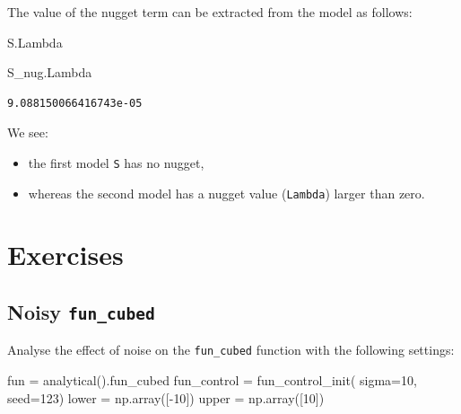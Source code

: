 \documentclass[
  letterpaper,
  DIV=11,
  numbers=noendperiod]{scrreprt}
\newenvironment{Shaded}{\begin{snugshade}}{\end{snugshade}}
\newcommand{\DecValTok}[1]{\textcolor[rgb]{0.68,0.00,0.00}{#1}}
\newcommand{\NormalTok}[1]{\textcolor[rgb]{0.00,0.23,0.31}{#1}}
\newcommand{\OperatorTok}[1]{\textcolor[rgb]{0.37,0.37,0.37}{#1}}
\providecommand{\tightlist}{%
  \setlength{\itemsep}{0pt}\setlength{\parskip}{0pt}}\usepackage{longtable,booktabs,array}
\begin{document}
The value of the nugget term can be extracted from the model as follows:

\begin{Shaded}
\begin{Highlighting}[]
\NormalTok{S.Lambda}
\end{Highlighting}
\end{Shaded}

\begin{Shaded}
\begin{Highlighting}[]
\NormalTok{S\_nug.Lambda}
\end{Highlighting}
\end{Shaded}

\begin{verbatim}
9.088150066416743e-05
\end{verbatim}

We see:

\begin{itemize}
\tightlist
\item
  the first model \texttt{S} has no nugget,
\item
  whereas the second model has a nugget value (\texttt{Lambda}) larger
  than zero.
\end{itemize}

\hypertarget{exercises-6}{%
\section{Exercises}\label{exercises-6}}

\hypertarget{noisy-fun_cubed-1}{%
\subsection{\texorpdfstring{Noisy
\texttt{fun\_cubed}}{Noisy fun\_cubed}}\label{noisy-fun_cubed-1}}

Analyse the effect of noise on the \texttt{fun\_cubed} function with the
following settings:

\begin{Shaded}
\begin{Highlighting}[]
\NormalTok{fun }\OperatorTok{=}\NormalTok{ analytical().fun\_cubed}
\NormalTok{fun\_control }\OperatorTok{=}\NormalTok{ fun\_control\_init(    }
\NormalTok{    sigma}\OperatorTok{=}\DecValTok{10}\NormalTok{,}
\NormalTok{    seed}\OperatorTok{=}\DecValTok{123}\NormalTok{)}
\NormalTok{lower }\OperatorTok{=}\NormalTok{ np.array([}\OperatorTok{{-}}\DecValTok{10}\NormalTok{])}
\NormalTok{upper }\OperatorTok{=}\NormalTok{ np.array([}\DecValTok{10}\NormalTok{])}
\end{Highlighting}
\end{Shaded}
\end{document}

